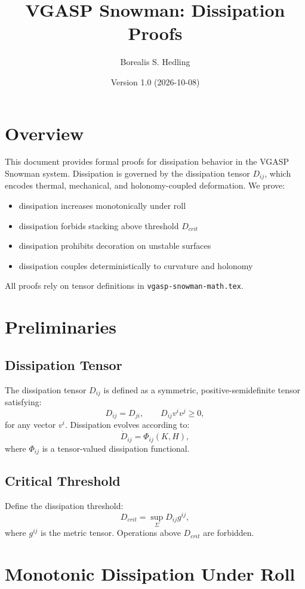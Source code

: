 \documentclass[12pt]{article}
\title{VGASP Snowman: Dissipation Proofs}
\author{Borealis S. Hedling}
\date{Version 1.0 (2026-10-08)}
\begin{document}
\maketitle

\section*{Overview}
This document provides formal proofs for dissipation behavior in the VGASP
Snowman system. Dissipation is governed by the dissipation tensor $D_{ij}$,
which encodes thermal, mechanical, and holonomy-coupled deformation. We prove:

\begin{itemize}
    \item dissipation increases monotonically under roll
    \item dissipation forbids stacking above threshold $D_{crit}$
    \item dissipation prohibits decoration on unstable surfaces
    \item dissipation couples deterministically to curvature and holonomy
\end{itemize}

All proofs rely on tensor definitions in \texttt{vgasp-snowman-math.tex}.

\section{Preliminaries}

\subsection{Dissipation Tensor}
The dissipation tensor $D_{ij}$ is defined as a symmetric, positive-semidefinite
tensor satisfying:
\[
D_{ij} = D_{ji}, \qquad D_{ij} v^i v^j \ge 0,
\]
for any vector $v^i$. Dissipation evolves according to:
\[
\dot{D}_{ij} = \Phi_{ij}(K, H),
\]
where $\Phi_{ij}$ is a tensor-valued dissipation functional.

\subsection{Critical Threshold}
Define the dissipation threshold:
\[
D_{crit} = \sup_{\Sigma} D_{ij} g^{ij},
\]
where $g^{ij}$ is the metric tensor. Operations above $D_{crit}$ are forbidden.

\section{Monotonic Dissipation Under Roll}
\end{document}
